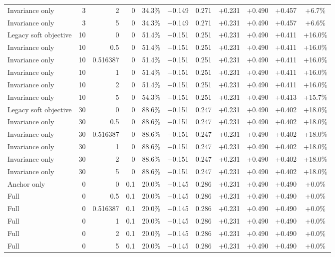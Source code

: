 \begin{table}[htbp]
\begin{tabular}{lrrrccccccc}
Invariance only & 3 & 2 & 0 & 34.3\% & +0.149 & 0.271 & +0.231 & +0.490 & +0.457 & +6.7\% \\
Invariance only & 3 & 5 & 0 & 34.3\% & +0.149 & 0.271 & +0.231 & +0.490 & +0.457 & +6.6\% \\
Legacy soft objective & 10 & 0 & 0 & 51.4\% & +0.151 & 0.251 & +0.231 & +0.490 & +0.411 & +16.0\% \\
Invariance only & 10 & 0.5 & 0 & 51.4\% & +0.151 & 0.251 & +0.231 & +0.490 & +0.411 & +16.0\% \\
Invariance only & 10 & 0.516387 & 0 & 51.4\% & +0.151 & 0.251 & +0.231 & +0.490 & +0.411 & +16.0\% \\
Invariance only & 10 & 1 & 0 & 51.4\% & +0.151 & 0.251 & +0.231 & +0.490 & +0.411 & +16.0\% \\
Invariance only & 10 & 2 & 0 & 51.4\% & +0.151 & 0.251 & +0.231 & +0.490 & +0.411 & +16.0\% \\
Invariance only & 10 & 5 & 0 & 54.3\% & +0.151 & 0.251 & +0.231 & +0.490 & +0.413 & +15.7\% \\
Legacy soft objective & 30 & 0 & 0 & 88.6\% & +0.151 & 0.247 & +0.231 & +0.490 & +0.402 & +18.0\% \\
Invariance only & 30 & 0.5 & 0 & 88.6\% & +0.151 & 0.247 & +0.231 & +0.490 & +0.402 & +18.0\% \\
Invariance only & 30 & 0.516387 & 0 & 88.6\% & +0.151 & 0.247 & +0.231 & +0.490 & +0.402 & +18.0\% \\
Invariance only & 30 & 1 & 0 & 88.6\% & +0.151 & 0.247 & +0.231 & +0.490 & +0.402 & +18.0\% \\
Invariance only & 30 & 2 & 0 & 88.6\% & +0.151 & 0.247 & +0.231 & +0.490 & +0.402 & +18.0\% \\
Invariance only & 30 & 5 & 0 & 88.6\% & +0.151 & 0.247 & +0.231 & +0.490 & +0.402 & +18.0\% \\
Anchor only & 0 & 0 & 0.1 & 20.0\% & +0.145 & 0.286 & +0.231 & +0.490 & +0.490 & +0.0\% \\
Full & 0 & 0.5 & 0.1 & 20.0\% & +0.145 & 0.286 & +0.231 & +0.490 & +0.490 & +0.0\% \\
Full & 0 & 0.516387 & 0.1 & 20.0\% & +0.145 & 0.286 & +0.231 & +0.490 & +0.490 & +0.0\% \\
Full & 0 & 1 & 0.1 & 20.0\% & +0.145 & 0.286 & +0.231 & +0.490 & +0.490 & +0.0\% \\
Full & 0 & 2 & 0.1 & 20.0\% & +0.145 & 0.286 & +0.231 & +0.490 & +0.490 & +0.0\% \\
Full & 0 & 5 & 0.1 & 20.0\% & +0.145 & 0.286 & +0.231 & +0.490 & +0.490 & +0.0\% \\

\end{tabular}
\end{table}
